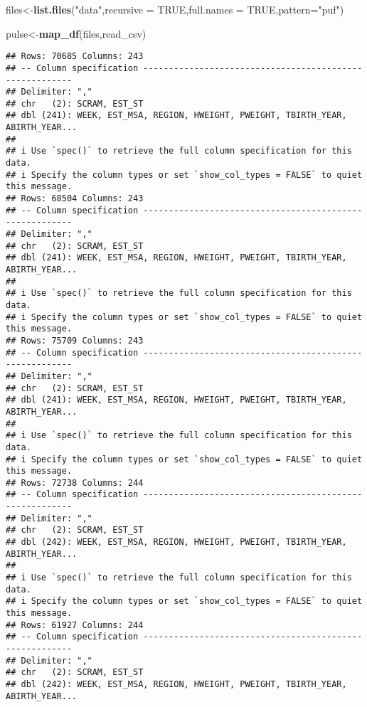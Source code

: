 \documentclass[
]{article}
\newenvironment{Shaded}{\begin{snugshade}}{\end{snugshade}}
\newcommand{\AttributeTok}[1]{\textcolor[rgb]{0.13,0.29,0.53}{#1}}
\newcommand{\ConstantTok}[1]{\textcolor[rgb]{0.56,0.35,0.01}{#1}}
\newcommand{\FunctionTok}[1]{\textcolor[rgb]{0.13,0.29,0.53}{\textbf{#1}}}
\newcommand{\NormalTok}[1]{#1}
\newcommand{\OtherTok}[1]{\textcolor[rgb]{0.56,0.35,0.01}{#1}}
\newcommand{\StringTok}[1]{\textcolor[rgb]{0.31,0.60,0.02}{#1}}
\begin{document}
\begin{Shaded}
\begin{Highlighting}[]
\NormalTok{files}\OtherTok{\textless{}{-}}\FunctionTok{list.files}\NormalTok{(}\StringTok{"data"}\NormalTok{,}\AttributeTok{recursive =} \ConstantTok{TRUE}\NormalTok{,}\AttributeTok{full.names =} \ConstantTok{TRUE}\NormalTok{,}\AttributeTok{pattern=}\StringTok{"puf"}\NormalTok{)}

\NormalTok{pulse}\OtherTok{\textless{}{-}}\FunctionTok{map\_df}\NormalTok{(files,read\_csv)}
\end{Highlighting}
\end{Shaded}

\begin{verbatim}
## Rows: 70685 Columns: 243
## -- Column specification --------------------------------------------------------
## Delimiter: ","
## chr   (2): SCRAM, EST_ST
## dbl (241): WEEK, EST_MSA, REGION, HWEIGHT, PWEIGHT, TBIRTH_YEAR, ABIRTH_YEAR...
## 
## i Use `spec()` to retrieve the full column specification for this data.
## i Specify the column types or set `show_col_types = FALSE` to quiet this message.
## Rows: 68504 Columns: 243
## -- Column specification --------------------------------------------------------
## Delimiter: ","
## chr   (2): SCRAM, EST_ST
## dbl (241): WEEK, EST_MSA, REGION, HWEIGHT, PWEIGHT, TBIRTH_YEAR, ABIRTH_YEAR...
## 
## i Use `spec()` to retrieve the full column specification for this data.
## i Specify the column types or set `show_col_types = FALSE` to quiet this message.
## Rows: 75709 Columns: 243
## -- Column specification --------------------------------------------------------
## Delimiter: ","
## chr   (2): SCRAM, EST_ST
## dbl (241): WEEK, EST_MSA, REGION, HWEIGHT, PWEIGHT, TBIRTH_YEAR, ABIRTH_YEAR...
## 
## i Use `spec()` to retrieve the full column specification for this data.
## i Specify the column types or set `show_col_types = FALSE` to quiet this message.
## Rows: 72738 Columns: 244
## -- Column specification --------------------------------------------------------
## Delimiter: ","
## chr   (2): SCRAM, EST_ST
## dbl (242): WEEK, EST_MSA, REGION, HWEIGHT, PWEIGHT, TBIRTH_YEAR, ABIRTH_YEAR...
## 
## i Use `spec()` to retrieve the full column specification for this data.
## i Specify the column types or set `show_col_types = FALSE` to quiet this message.
## Rows: 61927 Columns: 244
## -- Column specification --------------------------------------------------------
## Delimiter: ","
## chr   (2): SCRAM, EST_ST
## dbl (242): WEEK, EST_MSA, REGION, HWEIGHT, PWEIGHT, TBIRTH_YEAR, ABIRTH_YEAR...

\end{verbatim}
\end{document}
